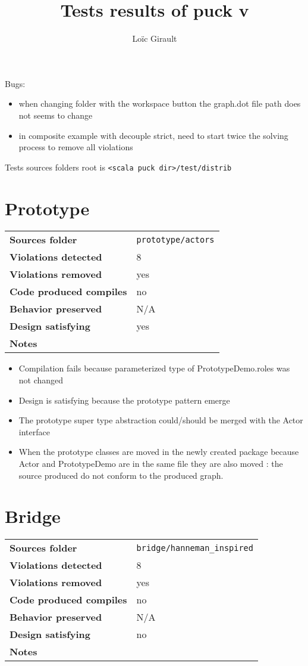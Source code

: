 \documentclass[french]{article}
\title{Tests results of puck v\puckVersion}
\author{Loïc Girault}
\begin{document}
\maketitle

Bugs: 
\begin{itemize}
\item when changing folder with the workspace button the graph.dot file path does not seems to change
\item in composite example with decouple strict, need to start twice the solving process to remove all violations
\end{itemize}

Tests sources folders root  is \texttt{<scala puck dir>/test/distrib}

\section*{Prototype}
\noindent\begin{tabular}{ l p{12cm} }
\textbf{Sources folder} &  \texttt{prototype/actors}\\
\textbf{Violations detected} &  8\\
\textbf{Violations removed} & yes \\
\textbf{Code produced compiles} & no \\
\textbf{Behavior preserved} & N/A\\
\textbf{Design satisfying} & yes\\
\textbf{Notes} & \\
\end{tabular}
\begin{itemize}
\item Compilation fails because parameterized type of PrototypeDemo.roles was not changed
\item Design is satisfying because the prototype pattern emerge
\item The prototype super type abstraction could/should be merged with the Actor interface
\item When the prototype classes are moved in the newly created package because Actor and PrototypeDemo are in the same file they are also moved : the source produced do not conform to the produced graph.
\end{itemize}

\section*{Bridge}
\noindent\begin{tabular}{ l p{12cm} }
\textbf{Sources folder} &  \texttt{bridge/hanneman\_inspired}\\
\textbf{Violations detected} & 8\\
\textbf{Violations removed} & yes\\
\textbf{Code produced compiles} & no\\
\textbf{Behavior preserved} & N/A\\
\textbf{Design satisfying} & no\\
\textbf{Notes} & \\
\end{tabular}
\end{document}
